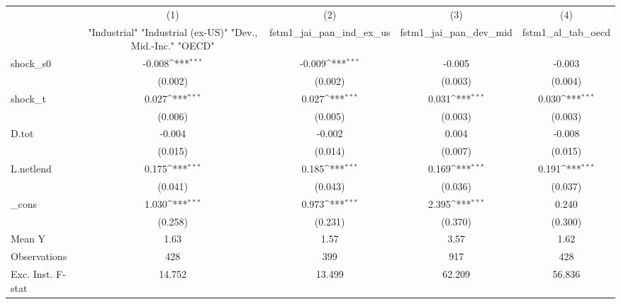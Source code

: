 {
\def\sym#1{\ifmmode^{#1}\else\(^{#1}\)\fi}
\begin{tabular}{l*{4}{c}}
\toprule
            &\multicolumn{1}{c}{(1)}&\multicolumn{1}{c}{(2)}&\multicolumn{1}{c}{(3)}&\multicolumn{1}{c}{(4)}\\
            &\multicolumn{1}{c}{ "Industrial" "Industrial (ex-US)" "Dev., Mid.-Inc." "OECD" }&\multicolumn{1}{c}{fstm1\_jai\_pan\_ind\_ex\_us}&\multicolumn{1}{c}{fstm1\_jai\_pan\_dev\_mid}&\multicolumn{1}{c}{fstm1\_al\_tab\_oecd}\\
\midrule
shock\_s0    &      -0.008\sym{***}&      -0.009\sym{***}&      -0.005         &      -0.003         \\
            &     (0.002)         &     (0.002)         &     (0.003)         &     (0.004)         \\
\addlinespace
shock\_t     &       0.027\sym{***}&       0.027\sym{***}&       0.031\sym{***}&       0.030\sym{***}\\
            &     (0.006)         &     (0.005)         &     (0.003)         &     (0.003)         \\
\addlinespace
D.tot       &      -0.004         &      -0.002         &       0.004         &      -0.008         \\
            &     (0.015)         &     (0.014)         &     (0.007)         &     (0.015)         \\
\addlinespace
L.netlend   &       0.175\sym{***}&       0.185\sym{***}&       0.169\sym{***}&       0.191\sym{***}\\
            &     (0.041)         &     (0.043)         &     (0.036)         &     (0.037)         \\
\addlinespace
\_cons      &       1.030\sym{***}&       0.973\sym{***}&       2.395\sym{***}&       0.240         \\
            &     (0.258)         &     (0.231)         &     (0.370)         &     (0.300)         \\
\midrule
Mean Y      &        1.63         &        1.57         &        3.57         &        1.62         \\
Observations&         428         &         399         &         917         &         428         \\
Exc. Inst. F-stat&      14.752         &      13.499         &      62.209         &      56.836         \\
\bottomrule
\end{tabular}
}
